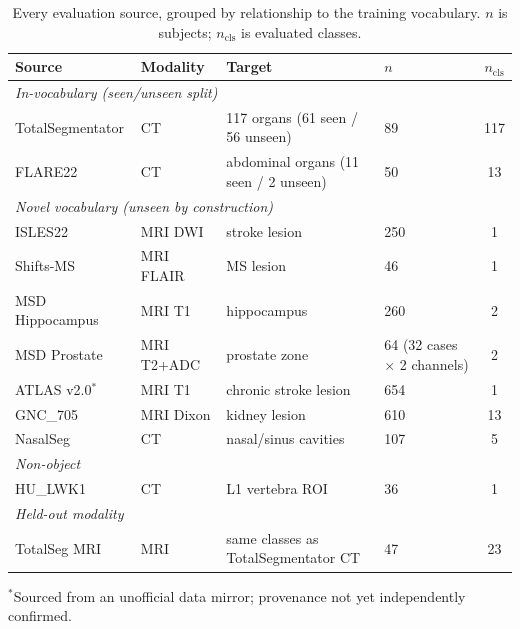 \begin{table}[t]
  \centering
  \small
  \caption{Every evaluation source, grouped by relationship to the training vocabulary.
  $n$ is subjects; $n_\text{cls}$ is evaluated classes.}
  \label{tab:ood-sources}
  \begin{tabular}{llllc}
    \toprule
    Source & Modality & Target & $n$ & $n_\text{cls}$ \\
    \midrule
    \multicolumn{5}{l}{\itshape In-vocabulary (seen/unseen split)} \\
    \midrule
    TotalSegmentator & CT & 117 organs (61 seen / 56 unseen) & 89 & 117 \\
    FLARE22 & CT & abdominal organs (11 seen / 2 unseen) & 50 & 13 \\
    \midrule
    \multicolumn{5}{l}{\itshape Novel vocabulary (unseen by construction)} \\
    \midrule
    ISLES22 & MRI DWI & stroke lesion & 250 & 1 \\
    Shifts-MS & MRI FLAIR & MS lesion & 46 & 1 \\
    MSD Hippocampus & MRI T1 & hippocampus & 260 & 2 \\
    MSD Prostate & MRI T2+ADC & prostate zone & 64 (32 cases $\times$ 2 channels) & 2 \\
    ATLAS v2.0$^{*}$ & MRI T1 & chronic stroke lesion & 654 & 1 \\
    GNC\_705 & MRI Dixon & kidney lesion & 610 & 13 \\
    NasalSeg & CT & nasal/sinus cavities & 107 & 5 \\
    \midrule
    \multicolumn{5}{l}{\itshape Non-object} \\
    \midrule
    HU\_LWK1 & CT & L1 vertebra ROI & 36 & 1 \\
    \midrule
    \multicolumn{5}{l}{\itshape Held-out modality} \\
    \midrule
    TotalSeg MRI & MRI & same classes as TotalSegmentator CT & 47 & 23 \\
    \bottomrule
  \end{tabular}
\end{table}
\noindent $^{*}$Sourced from an unofficial data mirror; provenance not yet
independently confirmed.
